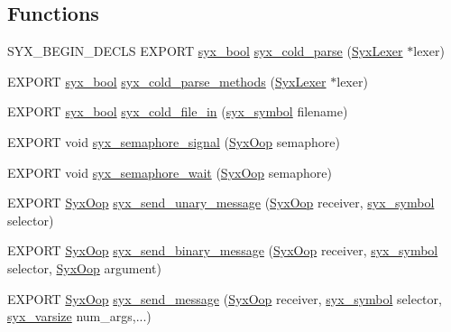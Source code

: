 \subsection*{Functions}
\begin{CompactItemize}
\item 
SYX\_\-BEGIN\_\-DECLS EXPORT \hyperlink{syx-types_8h_c6dc09b276b99fa1956364359139daab}{syx\_\-bool} \hyperlink{syx-utils_8h_64a1dbecdc9c844cd8e09dba2b7adf6d}{syx\_\-cold\_\-parse} (\hyperlink{struct_syx_lexer}{SyxLexer} $\ast$lexer)
\item 
EXPORT \hyperlink{syx-types_8h_c6dc09b276b99fa1956364359139daab}{syx\_\-bool} \hyperlink{syx-utils_8h_a7c09f55d7e8a1e33a4f40b6e3644995}{syx\_\-cold\_\-parse\_\-methods} (\hyperlink{struct_syx_lexer}{SyxLexer} $\ast$lexer)
\item 
EXPORT \hyperlink{syx-types_8h_c6dc09b276b99fa1956364359139daab}{syx\_\-bool} \hyperlink{syx-utils_8h_9c1676e48ea8f4339d62a426ad283f7a}{syx\_\-cold\_\-file\_\-in} (\hyperlink{syx-types_8h_9663af54b7b72f5d8be5f754ef356525}{syx\_\-symbol} filename)
\item 
EXPORT void \hyperlink{syx-utils_8h_a326bae67d329a47893ba0224ae445df}{syx\_\-semaphore\_\-signal} (\hyperlink{syx-types_8h_1121caba2d40b2ce090b640762744ccd}{SyxOop} semaphore)
\item 
EXPORT void \hyperlink{syx-utils_8h_44b0b96c5f8639eb3aa467b6dc440b6d}{syx\_\-semaphore\_\-wait} (\hyperlink{syx-types_8h_1121caba2d40b2ce090b640762744ccd}{SyxOop} semaphore)
\item 
EXPORT \hyperlink{syx-types_8h_1121caba2d40b2ce090b640762744ccd}{SyxOop} \hyperlink{syx-utils_8h_d543a115819575f96b987ee4c42594d6}{syx\_\-send\_\-unary\_\-message} (\hyperlink{syx-types_8h_1121caba2d40b2ce090b640762744ccd}{SyxOop} receiver, \hyperlink{syx-types_8h_9663af54b7b72f5d8be5f754ef356525}{syx\_\-symbol} selector)
\item 
EXPORT \hyperlink{syx-types_8h_1121caba2d40b2ce090b640762744ccd}{SyxOop} \hyperlink{syx-utils_8h_61a3e2addfd2720091b195c9a29741a7}{syx\_\-send\_\-binary\_\-message} (\hyperlink{syx-types_8h_1121caba2d40b2ce090b640762744ccd}{SyxOop} receiver, \hyperlink{syx-types_8h_9663af54b7b72f5d8be5f754ef356525}{syx\_\-symbol} selector, \hyperlink{syx-types_8h_1121caba2d40b2ce090b640762744ccd}{SyxOop} argument)
\item 
EXPORT \hyperlink{syx-types_8h_1121caba2d40b2ce090b640762744ccd}{SyxOop} \hyperlink{syx-utils_8h_1c63f0484b51652efbaecb22a6a5d2ed}{syx\_\-send\_\-message} (\hyperlink{syx-types_8h_1121caba2d40b2ce090b640762744ccd}{SyxOop} receiver, \hyperlink{syx-types_8h_9663af54b7b72f5d8be5f754ef356525}{syx\_\-symbol} selector, \hyperlink{syx-types_8h_18e1a1417591a1efb670b97ce320f535}{syx\_\-varsize} num\_\-args,...)

\end{CompactItemize}
